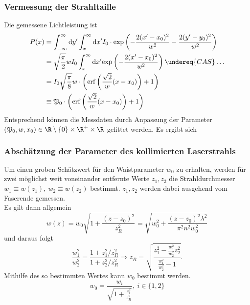 \documentclass[11pt,a4paper,oneside]{scrartcl}
\begin{document}
\subsubsection{Vermessung der Strahltaille}
Die gemessene Lichtleistung ist 
\begin{align}
P(x)&=\int_{-\infty}^\infty \mathrm dy^\prime \int_x^\infty \mathrm dx^\prime I_0\cdot\mathrm{exp}\left(-\frac{2(x^\prime-x_0)^2}{w^2}-\frac{2(y^\prime-y_0)^2}{w^2}\right) \\ \quad& = \sqrt{\frac{\pi}{2}}wI_0\int_x^\infty \mathrm dx^\prime \mathrm{exp}\left(-\frac{2(x^\prime-x_0)^2}{w^2}\right) \undereq{CAS}\hdots \\ \quad& =I_0\sqrt{\frac{\pi}{8}}w\cdot\left(\mathrm{erf}\left(\frac{\sqrt{2}}{w}(x-x_0)\right)+1\right)\\ \quad& \equiv \mathfrak{P}_0\cdot\left(\mathrm{erf}\left(\frac{\sqrt{2}}{w}(x-x_0)\right)+1\right)
\end{align}
Entsprechend können die Messdaten durch Anpassung der Parameter $(\mathfrak P_0,w,x_0)\in \R\setminus\{0\}\times\R^+\times\R$ gefittet werden.
Es ergibt sich 
\subsubsection{Abschätzung der Parameter des kollimierten Laserstrahls}
Um einen groben Schätzwert für den Waistparameter $w_0$ zu erhalten, werden für zwei möglichst weit voneinander entfernte Werte $z_1,z_2$ die Strahldurchmesser $w_1\equiv w(z_1),\ w_2\equiv w(z_2)$ bestimmt. $z_1,z_2$ werden dabei ausgehend vom Faserende gemessen. \\
Es gilt dann allgemein
\begin{equation}\label{w(z)}
w(z)=w_0\sqrt{1+\frac{(z-z_0)^2}{z_R^2}}=\sqrt{w_0^2+\frac{(z-z_0)^2\lambda^2}{\pi^2n^2w_0^2}}
\end{equation}
und daraus folgt
\begin{equation}
\frac{w_1^2}{w_2^2}=\frac{1+z_1^2/z_R^2}{1+z_2^2/z_R^2}\Rightarrow z_R=\sqrt{\frac{z_1^2-\frac{w_1^2}{w_2^2}z_2^2}{\frac{w_1^2}{w_2^2}-1}}.
\end{equation}
Mithilfe des so bestimmten Wertes kann $w_0$ bestimmt werden. 
\begin{equation}
w_0=\frac{w_i}{\sqrt{1+\frac{z_i^2}{z_R^2}}},\ i\in\{1,2 \}
\end{equation}
\end{document}
